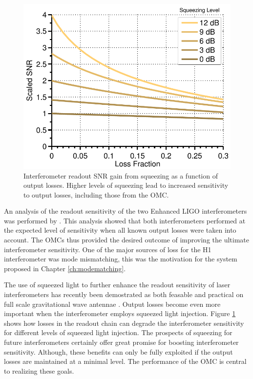 \begin{figure}
  \begin{center}
  \leavevmode
  \includegraphics{figs-omc/squeezeplot.pdf}
  \end{center}
  \caption[Interferometer readout SNR gain from squeezing as a function of output losses.]{Interferometer readout SNR gain from squeezing as a function of output losses. Higher levels of squeezing lead to increased sensitivity to output losses, including those from the OMC.}
  \label{fig:squeezeplot}
\end{figure}

An analysis of the readout sensitivity of the two Enhanced LIGO interferometers was performed by \citet{Tobin}. %
This analysis showed that both interferometers performed at the expected level of sensitivity when all known output losses were taken into account. %
The OMCs thus provided the desired outcome of improving the ultimate interferometer sensitivity. %
One of the major sources of loss for the H1 interferometer was mode mismatching, this was the motivation for the system proposed in Chapter \ref{ch:modematching}.

The use of squeezed light to further enhance the readout sensitivity of laser interferometers has recently been demostrated as both feasable and practical on full scale gravitational wave antennae \cite{GEOSqz:11,LIGOSqz}. %
Output losses become even more important when the interferometer employs squeezed light injection. %
Figure \ref{fig:squeezeplot} shows how losses in the readout chain can degrade the interferometer sensitivity for different levels of squeezed light injection. %
The prospects of squeezing for future interferometers certainly offer great promise for boosting interferometer sensitivity. %
Although, these benefits can only be fully exploited if the output losses are maintained at a minimal level. %
The performance of the OMC is central to realizing these goals.

